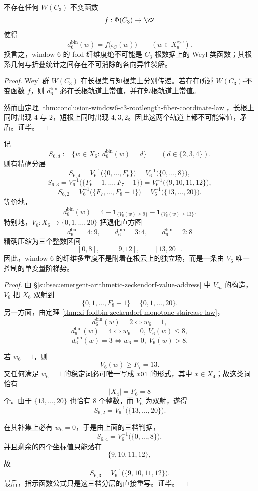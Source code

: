 \begin{corollary}\label{cor:conclusion-window6-c3-weyl-arithmetic-cleavage}
不存在任何 \(W(C_3)\)-不变函数
\[
f:\Phi(C_3)\to \ZZ
\]
使得
\[
d_6^{\mathrm{bin}}(w)=f\bigl(\iota_C(w)\bigr)
\qquad
(w\in X_6^{\mathrm{cyc}}).
\]
换言之，window-\(6\) 的 fold 纤维度绝不可能是 \(C_3\) 根数据上的 Weyl 类函数；其根系几何与折叠统计之间存在不可消除的各向异性裂解。
\end{corollary}
\begin{proof}
Weyl 群 \(W(C_3)\) 在长根集与短根集上分别传递。若存在所述 \(W(C_3)\)-不变函数 \(f\)，则 \(d_6^{\mathrm{bin}}\) 必在长根轨道上常值，并在短根轨道上常值。

然而由定理 \ref{thm:conclusion-window6-c3-rootlength-fiber-coordinate-law}，长根上同时出现 \(4\) 与 \(2\)，短根上同时出现 \(4,3,2\)。因此这两个轨道上都不可能常值，矛盾。证毕。
\end{proof}

\begin{theorem}\label{thm:conclusion-window6-fibonacci-staircase}
记
\[
S_{6,d}:=\{w\in X_6:\ d_6^{\mathrm{bin}}(w)=d\}
\qquad (d\in\{2,3,4\}).
\]
则有精确分层
\[
S_{6,4}
=
V_6^{-1}\!\bigl(\{0,\dots,F_6\}\bigr)
=
V_6^{-1}\!\bigl(\{0,\dots,8\}\bigr),
\]
\[
S_{6,3}
=
V_6^{-1}\!\bigl(\{F_6+1,\dots,F_7-1\}\bigr)
=
V_6^{-1}\!\bigl(\{9,10,11,12\}\bigr),
\]
\[
S_{6,2}
=
V_6^{-1}\!\bigl(\{F_7,\dots,F_8-1\}\bigr)
=
V_6^{-1}\!\bigl(\{13,\dots,20\}\bigr).
\]
等价地，
\[
d_6^{\mathrm{bin}}(w)
=
4-\mathbf 1_{\{V_6(w)\ge 9\}}-\mathbf 1_{\{V_6(w)\ge 13\}}.
\]
特别地，\(V_6:X_6\to\{0,1,\dots,20\}\) 把退化直方图
\[
d_6^{\mathrm{bin}}=4:9,\qquad
d_6^{\mathrm{bin}}=3:4,\qquad
d_6^{\mathrm{bin}}=2:8
\]
精确压缩为三个整数区间
\[
[0,8],\qquad [9,12],\qquad [13,20].
\]
因此，window-\(6\) 的纤维多重度不是附着在根云上的独立场，而是一条由 \(V_6\) 唯一控制的单变量阶梯势。
\end{theorem}
\begin{proof}
由 \S\ref{subsec:emergent-arithmetic-zeckendorf-value-address} 中 \(V_m\) 的构造，\(V_6\) 把 \(X_6\) 双射到
\[
\{0,1,\dots,F_8-1\}=\{0,1,\dots,20\}.
\]
另一方面，由定理 \ref{thm:xi-foldbin-zeckendorf-monotone-staircase-law}，
\[
d_6^{\mathrm{bin}}(w)=2
\iff
w_6=1,
\]
\[
d_6^{\mathrm{bin}}(w)=4
\iff
w_6=0,\ V_6(w)\le 8,
\]
\[
d_6^{\mathrm{bin}}(w)=3
\iff
w_6=0,\ V_6(w)>8.
\]

若 \(w_6=1\)，则
\[
V_6(w)\ge F_7=13.
\]
又任何满足 \(w_6=1\) 的稳定词必可唯一写成 \(x\mathtt{01}\) 的形式，其中 \(x\in X_4\)；故这类词恰有
\[
|X_4|=F_6=8
\]
个。由于 \(\{13,\dots,20\}\) 也恰有 \(8\) 个整数，而 \(V_6\) 为双射，遂得
\[
S_{6,2}=V_6^{-1}\!\bigl(\{13,\dots,20\}\bigr).
\]

在其补集上必有 \(w_6=0\)，于是由上面的三档判据，
\[
S_{6,4}=V_6^{-1}\!\bigl(\{0,\dots,8\}\bigr),
\]
并且剩余的四个坐标值只能落在
\[
\{9,10,11,12\},
\]
故
\[
S_{6,3}=V_6^{-1}\!\bigl(\{9,10,11,12\}\bigr).
\]
最后，指示函数公式只是这三档分层的直接重写。证毕。
\end{proof}

